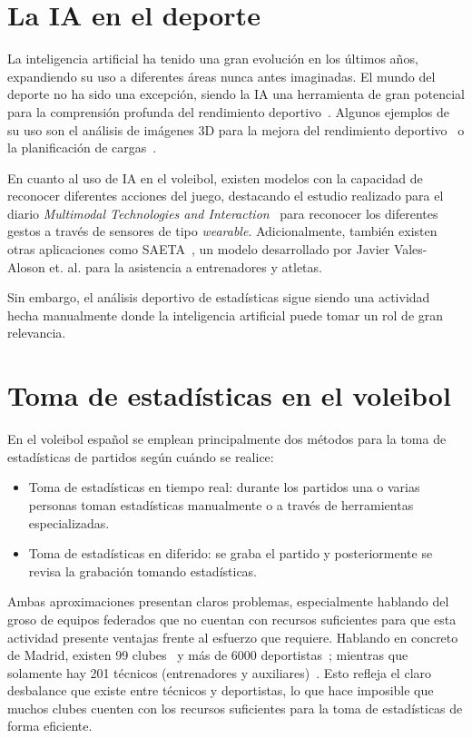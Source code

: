 \documentclass[12pt]{report} %
\begin{document}
    \section{La IA en el deporte}
    La inteligencia artificial ha tenido una gran evolución en los últimos
    años, expandiendo su uso a diferentes áreas nunca antes imaginadas. El
    mundo del deporte no ha sido una excepción, siendo la IA una herramienta de
    gran potencial para la comprensión profunda del rendimiento
    deportivo~\cite{ia-sport}. Algunos ejemplos de su uso son el análisis de
    imágenes 3D para la mejora del rendimiento deportivo~\cite{analysis3d} o la
    planificación de cargas~\cite{wl}. 

    En cuanto al uso de IA en el voleibol, existen modelos con la capacidad de
    reconocer diferentes acciones del juego, destacando el estudio realizado
    para el diario \textit{Multimodal Technologies and
    Interaction}~\cite{wearable} para reconocer los diferentes gestos a través
    de sensores de tipo \textit{wearable}. Adicionalmente, también existen
    otras aplicaciones como SAETA~\cite{SAETA}, un modelo desarrollado por
    Javier Vales-Aloson et. al. para  la asistencia a entrenadores y atletas.


    Sin embargo, el análisis deportivo de estadísticas sigue siendo una
    actividad hecha manualmente donde la inteligencia artificial puede tomar un
    rol de gran relevancia.


    \section{Toma de estadísticas en el voleibol}
    En el voleibol español se emplean principalmente dos
    métodos para la toma de estadísticas de partidos según cuándo se realice:
    \begin{itemize}
        \item Toma de estadísticas en tiempo real: durante los partidos una o
        varias personas toman estadísticas manualmente o a través de
        herramientas especializadas.
        \item Toma de estadísticas en diferido: se graba el partido y
        posteriormente se revisa la grabación tomando estadísticas.
    \end{itemize}

    Ambas aproximaciones presentan claros problemas, especialmente hablando del
    groso de equipos federados que no cuentan con recursos suficientes para que
    esta actividad presente ventajas frente al esfuerzo que requiere. Hablando
    en concreto de Madrid, existen 99 clubes~\cite{directorio-clubes} y más de
    6000 deportistas~\cite{estadisticasFEVB}; mientras que solamente hay
    201 técnicos (entrenadores y auxiliares)~\cite{estadisticasFEVB}. Esto
    refleja el claro desbalance que existe entre técnicos y deportistas, lo que
    hace imposible que muchos clubes cuenten con los recursos suficientes para
    la toma de estadísticas de forma eficiente.
\end{document}

